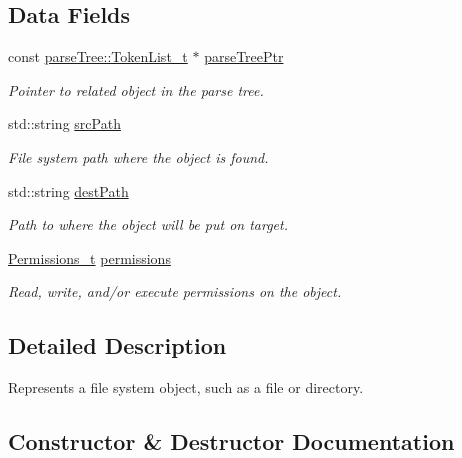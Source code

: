\subsection*{Data Fields}
\begin{DoxyCompactItemize}
\item 
const \hyperlink{structparse_tree_1_1_token_list__t}{parse\+Tree\+::\+Token\+List\+\_\+t} $\ast$ \hyperlink{struct_file_system_object__t_a33c640c1671ba4b4616783c45870d56e}{parse\+Tree\+Ptr}
\begin{DoxyCompactList}\small\item\em Pointer to related object in the parse tree. \end{DoxyCompactList}\item 
std\+::string \hyperlink{struct_file_system_object__t_a7624ce646d950f2320f570d5e2994404}{src\+Path}
\begin{DoxyCompactList}\small\item\em File system path where the object is found. \end{DoxyCompactList}\item 
std\+::string \hyperlink{struct_file_system_object__t_ac6dbb0856dbd74ac66c3f14436363b79}{dest\+Path}
\begin{DoxyCompactList}\small\item\em Path to where the object will be put on target. \end{DoxyCompactList}\item 
\hyperlink{struct_permissions__t}{Permissions\+\_\+t} \hyperlink{struct_file_system_object__t_a04b6bf4dfc13dd1e46bf5b944eb1d795}{permissions}
\begin{DoxyCompactList}\small\item\em Read, write, and/or execute permissions on the object. \end{DoxyCompactList}\end{DoxyCompactItemize}


\subsection{Detailed Description}
Represents a file system object, such as a file or directory. 

\subsection{Constructor \& Destructor Documentation}
